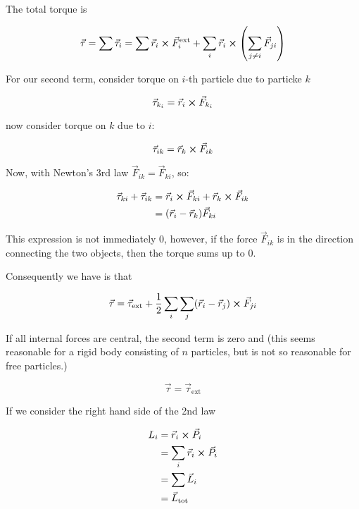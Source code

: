 The total torque is

\begin{equation}
	\vec\tau = \sum\vec\tau_i = \sum \vec r_i \cross \vec F_i^\mathrm{ext} + \sum_i \vec r_i \cross \left(\sum_{j\neq i} \vec F_{ji}\right)
\end{equation}

For our second term, consider torque on $i$-th particle due to particke $k$

\begin{equation}
	\vec\tau_{k_i} = \vec r_i \cross \vec F_{k_i}
\end{equation}

now consider torque on $k$ due to $i$:

\begin{equation}
	\vec\tau_{ik} = \vec r_{k} \cross \vec F_{ik}
\end{equation}

Now, with Newton's 3rd law $\vec F_{ik} = \vec F_{ki}$, so:

\begin{align}
	\vec\tau_{ki} + \vec\tau_{ik} &= \vec r_i \cross \vec F_{ki} + \vec r_k \cross \vec F_{ik}\\
	&= (\vec r_i - \vec r_k) \vec F_{ki}
\end{align}


This expression is not immediately 0, however, if the force $\vec F_{ik}$ is in the direction connecting the two objects, then the torque sums up to 0.

Consequently we have is that

\begin{equation}
	\vec \tau = \vec\tau_\mathrm{ext} + \frac{1}{2} \sum_i \sum_j (\vec r_i - \vec r_j) \cross \vec F_{ji} 
\end{equation}

If all internal forces are central, the second term is zero and (this seems reasonable for a rigid body consisting of $n$ particles, but is not so reasonable for free particles.)

\begin{equation}
	\vec\tau = \vec\tau_\mathrm{ext}
\end{equation}

If we consider the right hand side of the 2nd law

\begin{align}
	L_i &= \vec r_i \cross \vec P_i\\
	&= \sum_i \vec r_i \cross \vec P_i\\
	&= \sum \vec L_i\\
	&= \vec L_\mathrm{tot}
\end{align}

